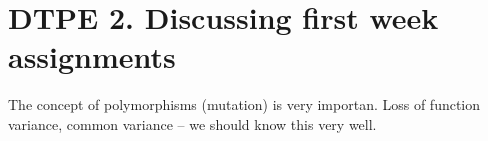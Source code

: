 \documentclass[main.tex]{subfiles}
\begin{document}
\section{DTPE 2. Discussing first week assignments}

The concept of polymorphisms (mutation) is very importan.
Loss of function variance, common variance -- we should know this very well.

\end{document}
